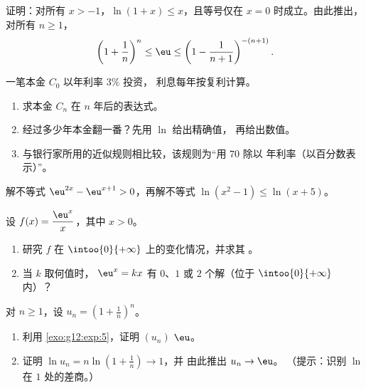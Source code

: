 \begin{exercise}[$\star\star$]\label{exo:g12:exp:5}
证明：对所有 $x > -1$，$\ln(1 + x) \leq x$，且等号仅在
$x = 0$ 时成立。由此推出，对所有 $n \geq 1$，
\[
\left(1 + \frac{1}{n}\right)^n \leq \eu \leq \left(1 - \frac{1}{n+1}\right)^{-(n+1)} .
\]
\end{exercise}

\begin{exercise}[$\star\star$]\label{exo:g12:exp:6}
一笔本金 $C_0$ 以年利率 $3\%$ 投资，
利息每年按复利计算。
\begin{enumerate}
  \item 求本金 $C_n$ 在 $n$ 年后的表达式。
  \item 经过多少年本金翻一番？先用 $\ln$ 给出精确值，
        再给出数值。
  \item 与银行家所用的近似规则相比较，该规则为“用 $70$ 除以
        年利率（以百分数表示）”。
\end{enumerate}
\end{exercise}

\begin{exercise}[$\star\star$]\label{exo:g12:exp:7}
解不等式 $\eu^{2x} - \eu^{x+1} > 0$，再解不等式
$\ln(x^2 - 1) \leq \ln(x + 5)$。
\end{exercise}

\begin{exercise}[$\star\star\star$]\label{exo:g12:exp:8}
设 $f(x) = \dfrac{\eu^x}{x}$，其中 $x > 0$。
\begin{enumerate}
  \item 研究 $f$ 在 $\intoo{0}{+\infty}$ 上的变化情况，并求其
        。
  \item 当 $k$ 取何值时， $\eu^x = kx$ 有 $0$、$1$
        或 $2$ 个解（位于 $\intoo{0}{+\infty}$ 内）？
\end{enumerate}
\end{exercise}

\begin{exercise}[$\star\star\star$]\label{exo:g12:exp:9}
对 $n \geq 1$，设 $u_n = \left(1 + \frac1n\right)^n$。
\begin{enumerate}
  \item 利用 \cref{exo:g12:exp:5}，证明 $(u_n)$  $\eu$。
  \item 证明 $\ln u_n = n \ln\left(1 + \frac1n\right) \to 1$，并
        由此推出 $u_n \to \eu$。
        （提示：识别 $\ln$ 在 $1$ 处的差商。）
\end{enumerate}
\end{exercise}

